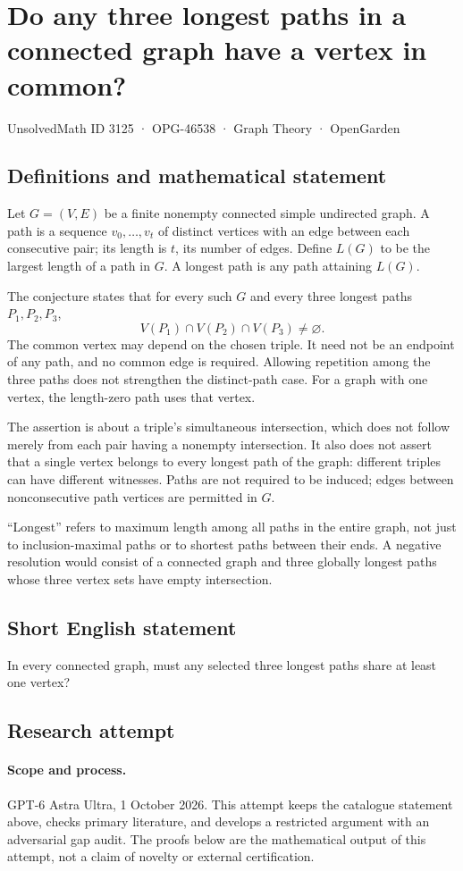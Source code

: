 \documentclass[11pt,a4paper]{article}
\begin{document}
\section*{Do any three longest paths in a connected graph have a vertex in common?}\label{3125}
{\small UnsolvedMath ID 3125 · OPG-46538 · Graph Theory · OpenGarden}
\subsection{Definitions and mathematical statement}
Let $G=(V,E)$ be a finite nonempty connected simple undirected graph.
A path is a sequence $v_0,\ldots,v_t$ of distinct vertices with an edge
between each consecutive pair; its length is $t$, its number of edges.
Define $L(G)$ to be the largest length of a path in $G$.
A longest path is any path attaining $L(G)$.

The conjecture states that for every such $G$ and every three longest
paths $P_1,P_2,P_3$,
\[
 V(P_1)\cap V(P_2)\cap V(P_3)\ne\varnothing.
\]
The common vertex may depend on the chosen triple. It need not be an
endpoint of any path, and no common edge is required. Allowing repetition
among the three paths does not strengthen the distinct-path case.
For a graph with one vertex, the length-zero path uses that vertex.

The assertion is about a triple's simultaneous intersection, which does
not follow merely from each pair having a nonempty intersection. It also
does not assert that a single vertex belongs to every longest path of
the graph: different triples can have different witnesses. Paths are
not required to be induced; edges between nonconsecutive path vertices
are permitted in $G$.

``Longest'' refers to maximum length among all paths in the entire graph,
not just to inclusion-maximal paths or to shortest paths between their
ends. A negative resolution would consist of a connected graph and
three globally longest paths whose three vertex sets have empty
intersection.
\subsection{Short English statement}
In every connected graph, must any selected three longest paths share at least one vertex?
\subsection{Research attempt}
\paragraph{Scope and process.}
GPT-6 Astra Ultra, 1 October 2026. This attempt keeps the catalogue statement above, checks primary literature, and develops a restricted argument with an adversarial gap audit. The proofs below are the mathematical output of this attempt, not a claim of novelty or external certification.
\end{document}
